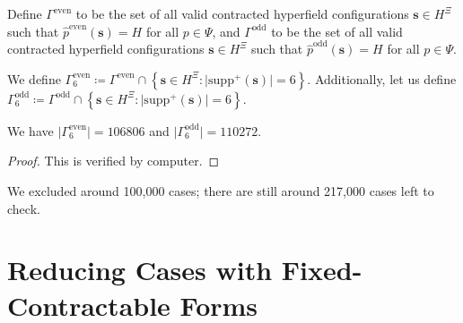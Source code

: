 \begin{definition}
 Define \( \Gamma^{\mathrm{even}} \) to be the set of all valid contracted hyperfield configurations \( \mathbf{s} \in H^{\Xi} \) such that \( \hat p^{\mathrm{even}}(\mathbf{s}) = H \) for all \( p \in \Psi \), and \( \Gamma^{\mathrm{odd}} \) to be the set of all valid contracted hyperfield configurations \( \mathbf{s} \in H^{\Xi} \) such that \( \hat p^{\mathrm{odd}}(\mathbf{s}) = H \) for all \( p \in \Psi \). 

\end{definition}

\begin{definition}
    We define \( \Gamma^{\mathrm{even}}_6 \coloneqq \Gamma^{\mathrm{even}} \cap \left\{ \mathbf{s} \in H^{\Xi} : \lvert \mathrm{supp}^+(\mathbf{s}) \rvert = 6 \right\} \). 
    Additionally, let us define \( \Gamma^{\mathrm{odd}}_6 \coloneqq \Gamma^{\mathrm{odd}} \cap \left\{ \mathbf{s} \in H^{\Xi} : \lvert \mathrm{supp}^+(\mathbf{s}) \rvert = 6 \right\} \).

\end{definition}

\begin{proposition}
    We have \( \lvert \Gamma^{\mathrm{even}}_6 \rvert  = 106806\) and \( \lvert \Gamma^{\mathrm{odd}}_6 \rvert  = 110272\).
\end{proposition}

\begin{proof}
    This is verified by computer.
\end{proof}

We excluded around 100,000 cases; there are still around 217,000 cases left to check.

\section{Reducing Cases with Fixed-Contractable Forms}

